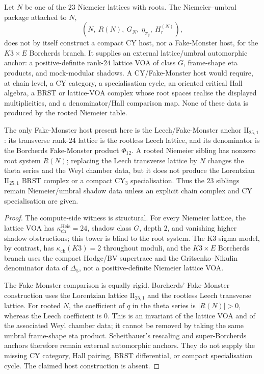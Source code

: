 \begin{proposition}
\label{prop:non-leech-niemeier-no-cy-fake-monster-host}
Let \(N\) be one of the \(23\) Niemeier lattices with roots. The
Niemeier--umbral package attached to \(N\),
\[
 (N,\ R(N),\ G_N,\ \eta_{\pi_g},\ H^{(N)}_r),
\]
does not by itself construct a compact CY host, nor a Fake-Monster
host, for the \(K3\times E\) Borcherds branch. It supplies an
external lattice/umbral automorphic anchor: a positive-definite
rank-\(24\) lattice VOA of class \(G\), frame-shape eta products, and
mock-modular shadows. A CY/Fake-Monster host would require, at
chain level, a CY category, a specialisation cycle, an oriented
critical Hall algebra, a BRST or lattice-VOA complex whose root
spaces realise the displayed multiplicities, and a denominator/Hall
comparison map. None of these data is produced by the rooted
Niemeier table.

The only Fake-Monster host present here is the Leech/Fake-Monster
anchor \(\mathrm{II}_{25,1}\): its transverse rank-\(24\) lattice is
the rootless Leech lattice, and its denominator is the Borcherds
Fake-Monster product \(\Phi_{12}\). A rooted Niemeier sibling has
nonzero root system \(R(N)\); replacing the Leech transverse lattice
by \(N\) changes the theta series and the Weyl chamber data, but it
does not produce the Lorentzian \(\mathrm{II}_{25,1}\) BRST complex
or a compact CY$_3$ specialisation. Thus the \(23\) siblings remain
Niemeier/umbral shadow data unless an explicit chain complex and
CY specialisation are given.
\end{proposition}

\begin{proof}
The compute-side witness is structural. For every Niemeier lattice,
the lattice VOA has \(\kappa_{\mathrm{ch}}^{\mathrm{Heis}}=24\),
shadow class \(G\), depth \(2\), and vanishing higher shadow
obstructions; this tower is blind to the root system. The K3 sigma
model, by contrast, has \(\kappa_{\mathrm{ch}}(K3)=2\) throughout
moduli, and the \(K3\times E\) Borcherds branch uses the compact
Hodge/BV supertrace and the Gritsenko--Nikulin denominator data of
\(\Delta_5\), not a positive-definite Niemeier lattice VOA.

The Fake-Monster comparison is equally rigid. Borcherds'
Fake-Monster construction uses the Lorentzian lattice
\(\mathrm{II}_{25,1}\) and the rootless Leech transverse lattice.
For rooted \(N\), the coefficient of \(q\) in the theta series is
\(|R(N)|>0\), whereas the Leech coefficient is \(0\). This is an
invariant of the lattice VOA and of the associated Weyl chamber
data; it cannot be removed by taking the same umbral frame-shape
eta product. Scheithauer's rescaling and super-Borcherds anchors
therefore remain external automorphic anchors. They do not supply
the missing CY category, Hall pairing, BRST differential, or
compact specialisation cycle. The claimed host construction is
absent.
\end{proof}

